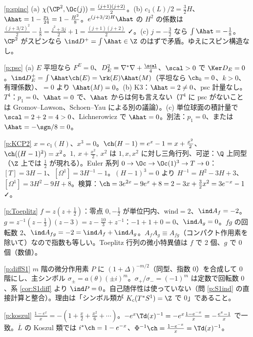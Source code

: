 \begin{sol}{\ref{p:spinc}}
(a) $\chi(\CP^2,\Oc(j))=\frac{(j+1)(j+2)}2$。(b) $c_1(L)/2=\frac32H$、$\Ahat=1-\frac{p_1}{24}=1-\frac{H^2}8$。$e^{(j+3/2)H}\Ahat$ の $H^2$ の係数は $\frac{(j+3/2)^2}2-\frac18=\frac{j^2+3j}{2}+1=\frac{(j+1)(j+2)}2$ ✓。(c) $j=-\frac32$ なら $\int\Ahat=-\frac18$。$\CP^2$ がスピンなら $\ind D^+=\int\Ahat\in\Z$ のはずで矛盾。ゆえにスピン構造なし。
\end{sol}
\begin{sol}{\ref{p:psc}}
(a) $E$ 平坦なら $F^E=0$、$D_E^2=\nabla^*\nabla+\frac{\scal}4$、$\scal>0$ で $\Ker D_E=0$。$\ind D_E^+=\int\Ahat\ch(E)=\rk(E)\Ahat(M)$（平坦なら $\ch_k=0$、$k>0$、有理係数）、$=0$ より $\Ahat(M)=0$。(b) K3：$\Ahat=2\ne0$、psc 計量なし。$T^4$：$p_1=0$、$\Ahat=0$ で、$\Ahat$ からは何も言えない（$T^4$ に psc がないことは Gromov--Lawson、Schoen--Yau による別の議論）。(c) 単位球面の積計量で $\scal=2+2=4>0$、Lichnerowicz で $\Ahat=0$。別法：$p_1=0$、または $\Ahat=-\sgn/8=0$。
\end{sol}
\begin{sol}{\ref{p:KCP2}}
$x=c_1(H)$、$x^3=0$。$\ch(H-1)=e^x-1=x+\frac{x^2}2$、$\ch((H-1)^2)=x^2$。$1,\ x+\frac{x^2}2,\ x^2$ は $1,x,x^2$ に対し三角行列、可逆：$\Q$ 上同型（$\Z$ 上では $\frac12$ が現れる）。Euler 系列 $0\to\Oc\to\Oc(1)^3\to T\to0$：$[T]=3H-1$、$[\Omega^1]=3H^{-1}-1$。$(H-1)^3=0$ より $H^{-1}=H^2-3H+3$、$[\Omega^1]=3H^2-9H+8$。検算：$\ch=3e^{2x}-9e^x+8=2-3x+\frac32x^2=3e^{-x}-1$ ✓。
\end{sol}
\begin{sol}{\ref{p:Toeplitz}}
$f=z(z+\frac12)$：零点 $0,-\frac12$ が単位円内、$\mathrm{wind}=2$、$\ind A_f=-2$。$g=z^{-1}(z-\frac13)(z-3)=z-\frac{10}3+z^{-1}$：$-1+1+0=0$、$\ind A_g=0$。$fg$ の回転数 $2$、$\ind A_{fg}=-2=\ind A_f+\ind A_g$。$A_fA_g\equiv A_{fg}$（コンパクト作用素を除いて）なので指数も等しい。Toeplitz 行列の微小特異値は $f$ で 2 個、$g$ で 0 個（数値）。
\end{sol}
\begin{sol}{\ref{p:diffS1}}
$m$ 階の微分作用素 $P$ に $(1+\Delta)^{-m/2}$（同型、指数 $0$）を合成して 0 階にし、主シンボル $\sigma_\pm=a(\theta)(\pm i)^m$。$\sigma_+/\sigma_-=(-1)^m$ は定数で回転数 $0$、系 \ref{cor:S1diff} より $\ind P=0$。自己随伴性は使っていない（問 \ref{p:S1ind} の直接計算と整合）。理由は「シンボル類が $K_c(T^*S^1)=\Z$ で $0$」であること。
\end{sol}
\begin{sol}{\ref{p:koszul}}
$\frac{1-e^x}x=-(1+\frac x2+\frac{x^2}6+\cdots)$。$-e^x\Td(x)^{-1}=-e^x\frac{1-e^{-x}}x=-\frac{e^x-1}x$ で一致。$\overline L$ の Koszul 類では $i^*\ch=1-e^{-x}$、$\Phi^{-1}\ch=\frac{1-e^{-x}}x=\Td(x)^{-1}$。
\end{sol}
